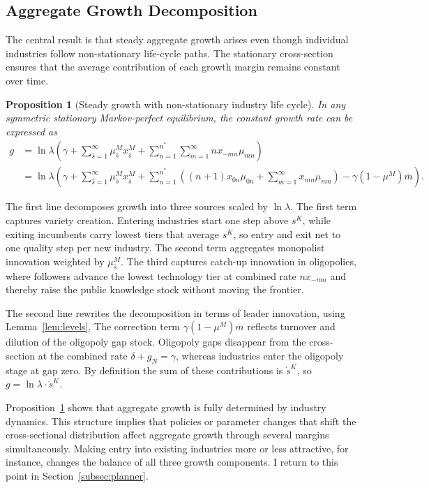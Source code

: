\documentclass[12pt]{article}
\newtheorem{proposition}{Proposition}[section]
\begin{document}
\subsection{Aggregate Growth Decomposition}

The central result is that steady aggregate growth arises even though individual industries follow non-stationary life-cycle paths. The stationary cross-section ensures that the average contribution of each growth margin remains constant over time.

\begin{proposition}[Steady growth with non-stationary industry life cycle]\label{prop:agggrowth}
    In any symmetric stationary Markov-perfect equilibrium, the constant growth rate can be expressed as
    \begin{align*}
    g&=\ln\lambda\left(\gamma+\sum^\infty_{\hat{s}=1}\mu^M_{\hat{s}}x^M_{\hat{s}}+\sum_{n=1}^{n^\ast}\sum^\infty_{m=1} nx_{-mn}\mu_{mn}\right)\\
    &=\ln\lambda\left(\gamma+\sum^\infty_{\hat{s}=1}\mu^M_{\hat{s}}x^M_{\hat{s}}+\sum_{n=1}^{n^\ast}\left((n+1)x_{0n}\mu_{0n}+\sum^\infty_{m=1} x_{mn}\mu_{mn}\right)-\gamma(1-\mu^M)\bar{m}\right).
    \end{align*}
\end{proposition}

The first line decomposes growth into three sources scaled by \(\ln\lambda\). The first term captures variety creation. Entering industries start one step above \(s^K\), while exiting incumbents carry lowest tiers that average \(s^K\), so entry and exit net to one quality step per new industry. The second term aggregates monopolist innovation weighted by \(\mu^M_{\hat{s}}\). The third captures catch-up innovation in oligopolies, where followers advance the lowest technology tier at combined rate \(nx_{-mn}\) and thereby raise the public knowledge stock without moving the frontier.

The second line rewrites the decomposition in terms of leader innovation, using Lemma~\ref{lem:levels}. The correction term $\gamma(1-\mu^M)\bar m$ reflects turnover and dilution of the oligopoly gap stock. Oligopoly gaps disappear from the cross-section at the combined rate $\delta+g_N=\gamma$, whereas industries enter the oligopoly stage at gap zero. By definition the sum of these contributions is \(\dot{s}^K\), so \(g=\ln\lambda\cdot\dot{s}^K\).

Proposition~\ref{prop:agggrowth} shows that aggregate growth is fully determined by industry dynamics. This structure implies that policies or parameter changes that shift the cross-sectional distribution affect aggregate growth through several margins simultaneously. Making entry into existing industries more or less attractive, for instance, changes the balance of all three growth components. I return to this point in Section~\ref{subsec:planner}.
\end{document}
